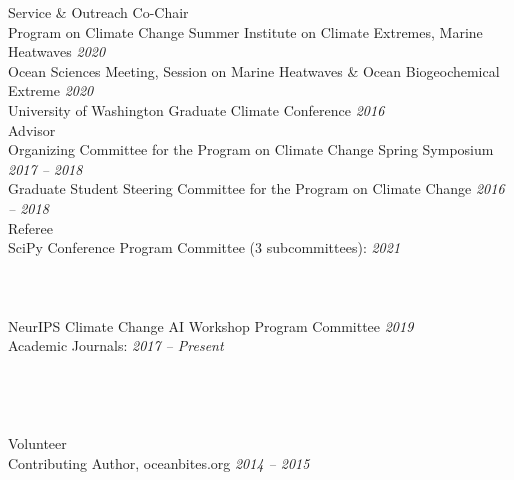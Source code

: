 \documentclass{resume} %
\begin{document}
\begin{rSection}{Service \& Outreach}
Co-Chair \\ \indent
\hspace{.7 cm} Program on Climate Change Summer Institute on Climate Extremes, Marine Heatwaves \hfill {\em 2020} \\ \indent
\hspace{.7 cm} Ocean Sciences Meeting, Session on Marine Heatwaves \& Ocean Biogeochemical Extreme  \hfill {\em 2020} \\ \indent 
\hspace{.7 cm} University of Washington Graduate Climate Conference \hfill {\em 2016} \\ \indent
Advisor \\ \indent
\hspace{.7 cm} Organizing Committee for the Program on Climate Change Spring Symposium \hfill {\em 2017 – 2018} \\ \indent 
\hspace{.7 cm} Graduate Student Steering Committee for the Program on Climate Change \hfill {\em 2016 – 2018} \\ \indent 
Referee \\ \indent
\hspace{.7 cm} SciPy Conference Program Committee (3 subcommittees): \hfill {\em 2021} \\ \indent
\hspace{1.4 cm}{Data Visualization and Image Processing} \\ \indent
\hspace{1.4 cm}{Earth, Ocean, Geo, \& Atmospheric Science} \\ \indent
\hspace{1.4 cm}{Scientific Applications of Machine Learning \& Data Science} \\ \indent 
\hspace{.7 cm} NeurIPS Climate Change AI Workshop Program Committee  \hfill {\em 2019} \\ \indent
\hspace{.7 cm} Academic Journals: \hfill {\em 2017 – Present}\\ \indent
\hspace{1.4 cm}{\em Geophysical Research Letters}  \\ \indent
\hspace{1.4 cm}{\em Journal of Climate} \\ \indent
\hspace{1.4 cm}{\em Journal of Geophysical Research-Oceans}  \\ \indent 
\hspace{1.4 cm}{\em Nature Communications Earth \& Environment} \\ \indent
Volunteer \\ \indent
\hspace{.7 cm} Contributing Author, oceanbites.org \hfill {\em 2014 – 2015}  
\end{rSection}
\end{document}
